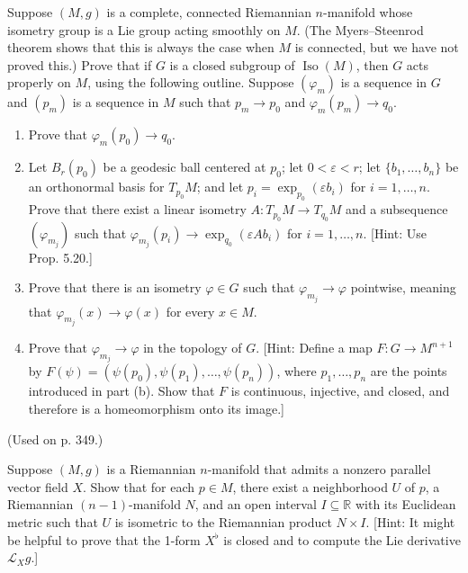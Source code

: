 \begin{exercise}
\label{prob:isometry-group-acts-properly}

Suppose $(M, g)$ is a complete, connected Riemannian $n$-manifold whose isometry group is a Lie group acting smoothly on $M$. (The Myers--Steenrod theorem shows that this is always the case when $M$ is connected, but we have not proved this.) Prove that if $G$ is a closed subgroup of $\operatorname{Iso}(M)$, then $G$ acts properly on $M$, using the following outline. Suppose $(\varphi_m)$ is a sequence in $G$ and $(p_m)$ is a sequence in $M$ such that $p_m \to p_0$ and $\varphi_m(p_m) \to q_0$.
\begin{enumerate}
\item[(a)] Prove that $\varphi_m(p_0) \to q_0$.
\item[(b)] Let $B_r(p_0)$ be a geodesic ball centered at $p_0$; let $0 < \varepsilon < r$; let $\{b_1, \ldots, b_n\}$ be an orthonormal basis for $T_{p_0}M$; and let $p_i = \exp_{p_0}(\varepsilon b_i)$ for $i = 1, \ldots, n$. Prove that there exist a linear isometry $A : T_{p_0}M \to T_{q_0}M$ and a subsequence $(\varphi_{m_j})$ such that $\varphi_{m_j}(p_i) \to \exp_{q_0}(\varepsilon A b_i)$ for $i = 1, \ldots, n$. [Hint: Use Prop. 5.20.]
\item[(c)] Prove that there is an isometry $\varphi \in G$ such that $\varphi_{m_j} \to \varphi$ pointwise, meaning that $\varphi_{m_j}(x) \to \varphi(x)$ for every $x \in M$.
\item[(d)] Prove that $\varphi_{m_j} \to \varphi$ in the topology of $G$. [Hint: Define a map $F: G \to M^{n+1}$ by $F(\psi) = (\psi(p_0), \psi(p_1), \ldots, \psi(p_n))$, where $p_1, \ldots, p_n$ are the points introduced in part (b). Show that $F$ is continuous, injective, and closed, and therefore is a homeomorphism onto its image.]
\end{enumerate}
(Used on p. 349.)
\end{exercise}

\begin{exercise}
\label{prob:parallel-vector-field}

Suppose $(M, g)$ is a Riemannian $n$-manifold that admits a nonzero parallel vector field $X$. Show that for each $p \in M$, there exist a neighborhood $U$ of $p$, a Riemannian $(n - 1)$-manifold $N$, and an open interval $I \subseteq \mathbb{R}$ with its Euclidean metric such that $U$ is isometric to the Riemannian product $N \times I$. [Hint: It might be helpful to prove that the 1-form $X^\flat$ is closed and to compute the Lie derivative $\mathcal{L}_X g$.]
\end{exercise}

